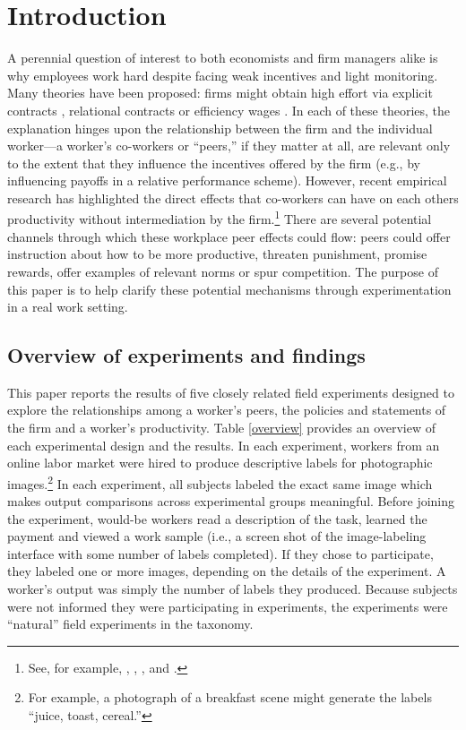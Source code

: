 \documentclass[12pt]{article}
\begin{document}
\newcommand{\imgW}{.65}
\newcommand{\imgWs}{.3}
\setkeys{Gin}{width=\imgW \textwidth}

\section{Introduction} 
A perennial question of interest to both economists and firm managers
alike is why employees work hard despite facing weak incentives and
light monitoring. Many theories have been proposed: firms might obtain
high effort via explicit contracts \citep{holmstrom1982moral},
relational contracts \citep{levin2003relational} or efficiency wages
\citep{katz1986efficiency}. In each of these theories, the explanation
hinges upon the relationship between the firm and the individual
worker---a worker's co-workers or ``peers,'' if they matter at all,
are relevant only to the extent that they influence the incentives
offered by the firm (e.g., by influencing payoffs in a relative
performance scheme). However, recent empirical research has
highlighted the direct effects that co-workers can have on each others
productivity without intermediation by the firm.\footnote{See, for
  example, \cite{bandiera2010social}, \cite{mas2009peers},
  \cite{falk2006clean}, and \cite{guryan2009peer}.}  There are several
potential channels through which these workplace peer effects could
flow: peers could offer instruction about how to be more productive,
threaten punishment, promise rewards, offer examples of relevant norms
or spur competition. The purpose of this paper is to help clarify
these potential mechanisms through experimentation in a real work
setting.

\subsection{Overview of experiments and findings} 
This paper reports the results of five closely related field
experiments designed to explore the relationships among a worker's
peers, the policies and statements of the firm and a worker's
productivity. Table \ref{overview} provides an overview of each
experimental design and the results. In each experiment, workers from
an online labor market were hired to produce descriptive labels for
photographic images.\footnote{For example, a photograph of a breakfast
  scene might generate the labels ``juice, toast, cereal.''} In each
experiment, all subjects labeled the exact same image which makes
output comparisons across experimental groups meaningful. Before
joining the experiment, would-be workers read a description of the
task, learned the payment and viewed a work sample (i.e., a screen
shot of the image-labeling interface with some number of labels
completed).  If they chose to participate, they labeled one or more
images, depending on the details of the experiment. A worker's output
was simply the number of labels they produced. Because subjects were
not informed they were participating in experiments, the experiments
were ``natural'' field experiments in the \cite{harrison2004field}
taxonomy.
\end{document}
